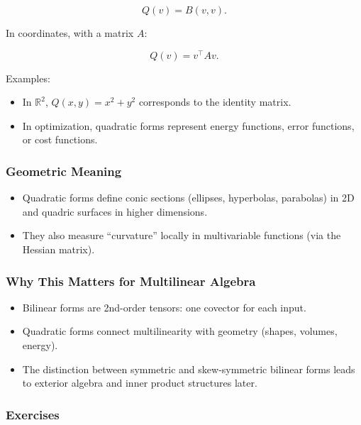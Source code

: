 \documentclass[
  letterpaper,
  DIV=11,
  numbers=noendperiod]{scrreprt}
\providecommand{\tightlist}{%
  \setlength{\itemsep}{0pt}\setlength{\parskip}{0pt}}
\begin{document}
\[
Q(v) = B(v,v).
\]

In coordinates, with a matrix \(A\):

\[
Q(v) = v^\top A v.
\]

Examples:

\begin{itemize}
\tightlist
\item
  In \(\mathbb{R}^2\), \(Q(x,y) = x^2 + y^2\) corresponds to the
  identity matrix.
\item
  In optimization, quadratic forms represent energy functions, error
  functions, or cost functions.
\end{itemize}

\subsubsection{Geometric Meaning}\label{geometric-meaning}

\begin{itemize}
\tightlist
\item
  Quadratic forms define conic sections (ellipses, hyperbolas,
  parabolas) in 2D and quadric surfaces in higher dimensions.
\item
  They also measure ``curvature'' locally in multivariable functions
  (via the Hessian matrix).
\end{itemize}

\subsubsection{Why This Matters for Multilinear
Algebra}\label{why-this-matters-for-multilinear-algebra-3}

\begin{itemize}
\tightlist
\item
  Bilinear forms are 2nd-order tensors: one covector for each input.
\item
  Quadratic forms connect multilinearity with geometry (shapes, volumes,
  energy).
\item
  The distinction between symmetric and skew-symmetric bilinear forms
  leads to exterior algebra and inner product structures later.
\end{itemize}

\subsubsection{Exercises}\label{exercises-7}
\end{document}
